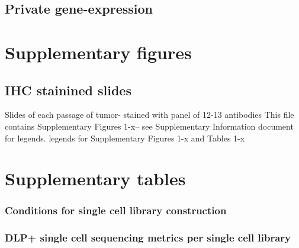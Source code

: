 \documentclass{article}
\begin{document}
\subsection{Private gene-expression}





\section{Supplementary figures}




\subsection{IHC stainined slides}
Slides of each passage of tumor- stained with panel of 12-13 antibodies
This file contains Supplementary Figures 1-x– see Supplementary Information document for legends.
legends for Supplementary Figures 1-x and Tables 1-x

\section{Supplementary tables}
\subsubsection{Conditions for single cell library construction}

\subsubsection{DLP+ single cell sequencing metrics per single cell library}
\begin{comment}
\end{comment}
\end{document}
